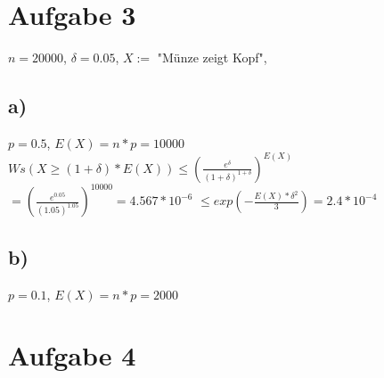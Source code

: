 \documentclass[a4paper,10pt,oneside,leqno]{scrartcl}
\begin{document}
\section*{Aufgabe 3}%
$n=20000$, $\delta = 0.05$, $X :=$ "Münze zeigt Kopf",
\subsection*{a)}
$p = 0.5$, $E(X) = n*p = 10000$\newline
$Ws(X \geq (1+\delta) * E(X)) \leq (\frac{e^{\delta}}{(1+\delta)^{1+\delta}})^{E(X)}$\newline
$=(\frac{e^{0.05}}{(1.05)^{1.05}})^{10000} = 4.567*10^{-6}$\newline
$\leq exp(-\frac{E(X)*\delta^2}{3}) = 2.4*10^{-4}$

\subsection*{b)}
$p = 0.1$, $E(X) = n*p = 2000$

\section*{Aufgabe 4}%
\end{document}
